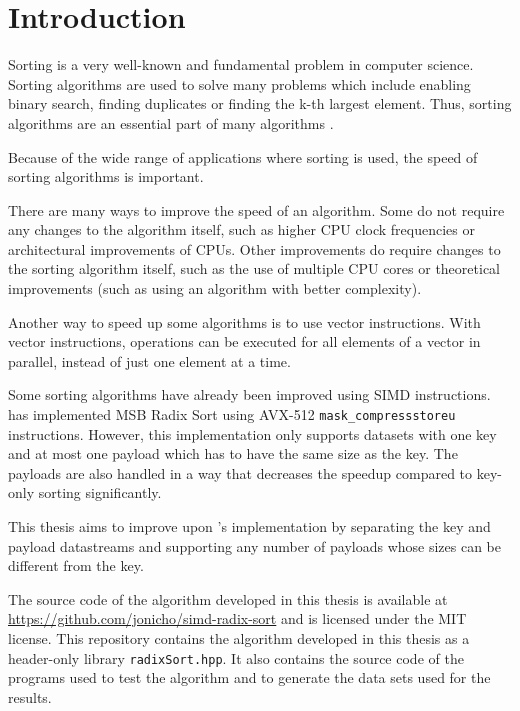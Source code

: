 \documentclass[12pt, a4paper, openright, twoside]{tiarbeit}
\begin{document}
\chapter{Introduction}\label{chap:introduction}
\setcounter{romanpage}{\value{page}}

Sorting is a very well-known and fundamental problem in computer
science. Sorting algorithms are used to solve many problems which include
enabling binary search, finding duplicates or finding the k-th largest element.
Thus, sorting algorithms are an essential part of many algorithms
\citetext{\citealp[p. 148]{intro_to_algorithms};
  \citealp[pp. 104-106]{alg_design_manual}}.

Because of the wide range of applications where sorting is used, the speed of
sorting algorithms is important.

There are many ways to improve the speed of an algorithm.
Some do not require any changes to the algorithm itself, such as higher
CPU clock frequencies or architectural improvements of CPUs.
Other improvements do require changes to the sorting algorithm itself, such as
the use of multiple CPU cores or theoretical improvements
(such as using an algorithm with better complexity).

Another way to speed up some algorithms is to use vector instructions.
With vector instructions, operations can be executed for all elements of a
vector in parallel, instead of just one element at a time.

Some sorting algorithms have already been improved using SIMD instructions.
\citet{moeller_radix} has implemented MSB Radix Sort using AVX-512
\texttt{mask\_compressstoreu} instructions.
However, this implementation only supports datasets with one key and
at most one payload which has to have the same size as the key.
The payloads are also handled in a way that decreases the speedup compared
to key-only sorting significantly.

This thesis aims to improve upon \citeauthor{moeller_radix}'s implementation by separating the key and
payload datastreams and supporting any number of payloads whose sizes
can be different from the key.

The source code of the algorithm developed in this thesis is available
at \url{https://github.com/jonicho/simd-radix-sort} and is licensed under the
MIT license.
This repository contains the algorithm developed in this thesis as a
header-only library \texttt{radixSort.hpp}.
It also contains the source code of the programs used to test the algorithm
and to generate the data sets used for the results.
\end{document}
